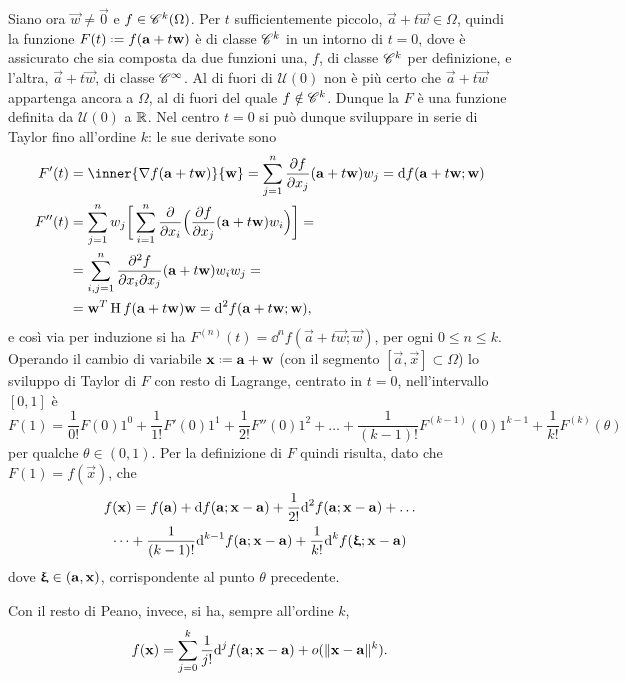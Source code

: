 Siano ora $\vec w\neq\vec 0$ e $f\in\cont[k]{\Omega}$. Per $t$ sufficientemente piccolo, $\vec a+t\vec w\in\Omega$, quindi la funzione $F(t)\defeq f(\vec a+t\vec w)$ è di classe $\cclass[k]$ in un intorno di $t=0$, dove è assicurato che sia composta da due funzioni una, $f$, di classe $\cclass[k]$ per definizione, e l'altra, $\vec a+t\vec w$, di classe $\cclass[\infty]$. Al di fuori di $\mathcal U(0)$ non è più certo che $\vec a+t\vec w$ appartenga ancora a $\Omega$, al di fuori del quale $f\notin\cclass[k]$. Dunque la $F$ è una funzione definita da $\mathcal U(0)$ a $\R$. Nel centro $t=0$ si può dunque sviluppare in serie di Taylor fino all'ordine $k$: le sue derivate sono
\begin{equation}\begin{aligned}
F'(t)	&=\inner{\grad f(\vec a+t\vec w)}{\vec w}=\sum_{j=1}^n\drp{f}{x_j}(\vec a+t\vec w)w_j=\dd f(\vec a+t\vec w;\vec w)\\
F''(t)	&=\sum_{j=1}^nw_j\bigg[\sum_{i=1}^n\drp{}{x_i}\Big(\drp{f}{x_j}(\vec a+t\vec w)w_i\Big)\bigg]=\\
		&=\sum_{i,j=1}^n\frac{\partial^2f}{\partial x_i\partial x_j}(\vec a+t\vec w)w_iw_j=\\
		&=\vec w^T\hes f(\vec a+t\vec w)\vec w=\dd^2f(\vec a+t\vec w;\vec w),
\end{aligned}\end{equation}
e così via per induzione %
si ha $F^{(n)}(t)=\dd^nf(\vec a+t\vec w;\vec w)$, per ogni $0\leq n\leq k$.
Operando il cambio di variabile $\vec x\defeq\vec a+\vec w$ (con il segmento $[\vec a,\vec x]\subset\Omega$) lo sviluppo di Taylor di $F$ con resto di Lagrange, centrato in $t=0$, nell'intervallo $[0,1]$ è
\[
F(1)=\frac1{0!}F(0)1^0+\frac1{1!}F'(0)1^1+\frac1{2!}F''(0)1^2+\dots+\frac1{(k-1)!}F^{(k-1)}(0)1^{k-1}+\frac1{k!}F^{(k)}(\theta)
\]
per qualche $\theta\in(0,1)$. Per la definizione di $F$ quindi risulta, dato che $F(1)=f(\vec x)$, che
\begin{multline} \label{eq:formula_taylor_lagrange_piu_variabili}
f(\vec x)=f(\vec a)+\dd f(\vec a;\vec x-\vec a)+\frac1{2!}\dd^2f(\vec a;\vec x-\vec a)+\dots\\
\dots+\frac1{(k-1)!}\dd^{k-1}f(\vec a;\vec x-\vec a)+\frac1{k!}\dd^kf(\vxi;\vec x-\vec a)
\end{multline}
dove $\vxi\in(\vec a,\vec x)$, corrispondente al punto $\theta$ precedente.

Con il resto di Peano, invece, si ha, sempre all'ordine $k$,
\begin{equation} \label{eq:formula_taylor_peano_piu_variabili}
f(\vec x)=\sum_{j=0}^k\frac1{j!}\dd^jf(\vec a;\vec x-\vec a)+o(\norm{\vec x-\vec a}^k).
\end{equation}

